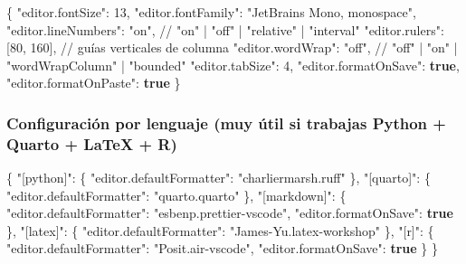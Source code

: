 \documentclass[
  doc,
  floatsintext,
  longtable,
  a4paper,
  nolmodern,
  notxfonts,
  notimes,
  12pt,
  colorlinks=true,linkcolor=blue,citecolor=blue,urlcolor=blue]{apa7}
\newenvironment{Shaded}{\begin{snugshade}}{\end{snugshade}}
\newcommand{\DataTypeTok}[1]{\textcolor[rgb]{0.68,0.00,0.00}{#1}}
\newcommand{\DecValTok}[1]{\textcolor[rgb]{0.68,0.00,0.00}{#1}}
\newcommand{\ErrorTok}[1]{\textcolor[rgb]{0.68,0.00,0.00}{#1}}
\newcommand{\FunctionTok}[1]{\textcolor[rgb]{0.28,0.35,0.67}{#1}}
\newcommand{\KeywordTok}[1]{\textcolor[rgb]{0.00,0.23,0.31}{\textbf{#1}}}
\newcommand{\OtherTok}[1]{\textcolor[rgb]{0.00,0.23,0.31}{#1}}
\newcommand{\StringTok}[1]{\textcolor[rgb]{0.13,0.47,0.30}{#1}}
\begin{document}
\begin{Shaded}
\begin{Highlighting}[]
\FunctionTok{\{}
  \DataTypeTok{"editor.fontSize"}\FunctionTok{:} \DecValTok{13}\FunctionTok{,}
  \DataTypeTok{"editor.fontFamily"}\FunctionTok{:} \StringTok{"\textquotesingle{}JetBrains Mono\textquotesingle{}, monospace"}\FunctionTok{,}
  \DataTypeTok{"editor.lineNumbers"}\FunctionTok{:} \StringTok{"on"}\FunctionTok{,} \ErrorTok{//} \DataTypeTok{"on"} \ErrorTok{|} \DataTypeTok{"off"} \ErrorTok{|} \DataTypeTok{"relative"} \ErrorTok{|} \DataTypeTok{"interval"}
  \DataTypeTok{"editor.rulers"}\FunctionTok{:} \OtherTok{[}\DecValTok{80}\OtherTok{,} \DecValTok{160}\OtherTok{]}\FunctionTok{,} \ErrorTok{//} \ErrorTok{guías} \ErrorTok{verticales} \ErrorTok{de} \ErrorTok{columna}
  \DataTypeTok{"editor.wordWrap"}\FunctionTok{:} \StringTok{"off"}\FunctionTok{,} \ErrorTok{//} \DataTypeTok{"off"} \ErrorTok{|} \DataTypeTok{"on"} \ErrorTok{|} \DataTypeTok{"wordWrapColumn"} \ErrorTok{|} \DataTypeTok{"bounded"}
  \DataTypeTok{"editor.tabSize"}\FunctionTok{:} \DecValTok{4}\FunctionTok{,}
  \DataTypeTok{"editor.formatOnSave"}\FunctionTok{:} \KeywordTok{true}\FunctionTok{,}
  \DataTypeTok{"editor.formatOnPaste"}\FunctionTok{:} \KeywordTok{true}
\FunctionTok{\}}
\end{Highlighting}
\end{Shaded}

\subsubsection{Configuración por lenguaje (muy útil si trabajas Python +
Quarto + LaTeX +
R)}\label{configuraciuxf3n-por-lenguaje-muy-uxfatil-si-trabajas-python-quarto-latex-r}

\begin{Shaded}
\begin{Highlighting}[]
\FunctionTok{\{}
  \DataTypeTok{"[python]"}\FunctionTok{:} \FunctionTok{\{}
    \DataTypeTok{"editor.defaultFormatter"}\FunctionTok{:} \StringTok{"charliermarsh.ruff"}
  \FunctionTok{\},}
  \DataTypeTok{"[quarto]"}\FunctionTok{:} \FunctionTok{\{}
    \DataTypeTok{"editor.defaultFormatter"}\FunctionTok{:} \StringTok{"quarto.quarto"}
  \FunctionTok{\},}
  \DataTypeTok{"[markdown]"}\FunctionTok{:} \FunctionTok{\{}
    \DataTypeTok{"editor.defaultFormatter"}\FunctionTok{:} \StringTok{"esbenp.prettier{-}vscode"}\FunctionTok{,}
    \DataTypeTok{"editor.formatOnSave"}\FunctionTok{:} \KeywordTok{true}
  \FunctionTok{\},}
  \DataTypeTok{"[latex]"}\FunctionTok{:} \FunctionTok{\{}
    \DataTypeTok{"editor.defaultFormatter"}\FunctionTok{:} \StringTok{"James{-}Yu.latex{-}workshop"}
  \FunctionTok{\},}
  \DataTypeTok{"[r]"}\FunctionTok{:} \FunctionTok{\{}
    \DataTypeTok{"editor.defaultFormatter"}\FunctionTok{:} \StringTok{"Posit.air{-}vscode"}\FunctionTok{,}
    \DataTypeTok{"editor.formatOnSave"}\FunctionTok{:} \KeywordTok{true}
  \FunctionTok{\}}
\FunctionTok{\}}
\end{Highlighting}
\end{Shaded}
\end{document}
